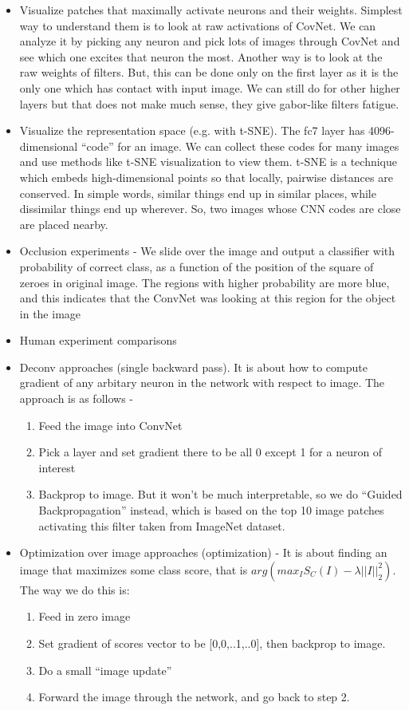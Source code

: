 \documentclass[12pt,a4paper]{article}
\begin{document}
\begin{itemize}
    \item Visualize patches that maximally activate neurons and their weights. Simplest way to understand them is to look at raw activations of CovNet. We can analyze it by picking any neuron and pick lots of images through CovNet and see which one excites that neuron the most. Another way is to look at the raw weights of filters. But, this can be done only on the first layer as it is the only one which has contact with input image. We can still do for other higher layers but that does not make much sense, they give gabor-like filters fatigue.
    \item Visualize the representation space (e.g. with t-SNE). The fc7 layer has 4096-dimensional ``code'' for an image. We can collect these codes for many images and use methods like t-SNE visualization to view them. t-SNE is a technique which embeds high-dimensional points so that locally, pairwise distances are conserved. In simple words, similar things end up in similar places, while dissimilar things end up wherever. So, two images whose CNN codes are close are placed nearby.
    \item Occlusion experiments - We slide over the image and output a classifier with probability of correct class, as a function of the position of the square of zeroes in original image. The regions with higher probability are more blue, and this indicates that the ConvNet was looking at this region for the object in the image
    \item Human experiment comparisons 
    \item Deconv approaches (single backward pass). It is about how to compute gradient of any arbitary neuron in the network with respect to image. The approach is as follows - 
    \begin{enumerate}
        \item Feed the image into ConvNet
        \item Pick a layer and set gradient there to be all 0 except 1 for a neuron of interest
        \item Backprop to image. But it won't be much interpretable, so we do ``Guided Backpropagation'' instead, which is based on the top 10 image patches activating this filter taken from ImageNet dataset.
    \end{enumerate}
     \item Optimization over image approaches (optimization) - It is about finding an image that maximizes some class score, that is $arg(max_{I} S_{C}(I) - \lambda ||I||_{2}^{2})$. The way we do this is:
     \begin{enumerate}
         \item Feed in zero image
         \item Set gradient of scores vector to be [0,0,..1,..0], then backprop to image.
         \item Do a small ``image update''
         \item Forward the image through the network, and go back to step 2.
     \end{enumerate}
\end{itemize}
\end{document}

